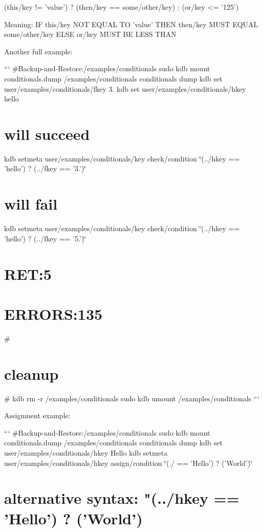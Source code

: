 \begin{DoxyVerb}(this/key  != 'value') ? (then/key == some/other/key) : (or/key <= '125')
\end{DoxyVerb}


Meaning\+: I\+F {\ttfamily this/key} N\+O\+T E\+Q\+U\+A\+L T\+O {\ttfamily 'value'} T\+H\+E\+N {\ttfamily then/key} M\+U\+S\+T E\+Q\+U\+A\+L {\ttfamily some/other/key} E\+L\+S\+E {\ttfamily or/key} M\+U\+S\+T B\+E L\+E\+S\+S T\+H\+A\+N {}

Another full example\+:

``` \#\+Backup-\/and-\/\+Restore\+:/examples/conditionals sudo kdb mount conditionals.\+dump /examples/conditionals conditionals dump kdb set user/examples/conditionals/fkey 3. kdb set user/examples/conditionals/hkey hello \section*{will succeed}

kdb setmeta user/examples/conditionals/key check/condition \char`\"{}(../hkey == 'hello') ? (../fkey == '3.')\char`\"{} \section*{will fail}

kdb setmeta user/examples/conditionals/key check/condition \char`\"{}(../hkey == 'hello') ? (../fkey == '5.')\char`\"{} \section*{R\+E\+T\+:5}

\section*{E\+R\+R\+O\+R\+S\+:135}

\# \section*{cleanup}

\# kdb rm -\/r /examples/conditionals sudo kdb umount /examples/conditionals ```

Assignment example\+:

``` \#\+Backup-\/and-\/\+Restore\+:/examples/conditionals sudo kdb mount conditionals.\+dump /examples/conditionals conditionals dump kdb set user/examples/conditionals/hkey Hello kdb setmeta user/examples/conditionals/hkey assign/condition \char`\"{}(./ == '\+Hello') ? ('\+World')\char`\"{} \section*{alternative syntax\+: "(../hkey == 'Hello') ? ('World')}

